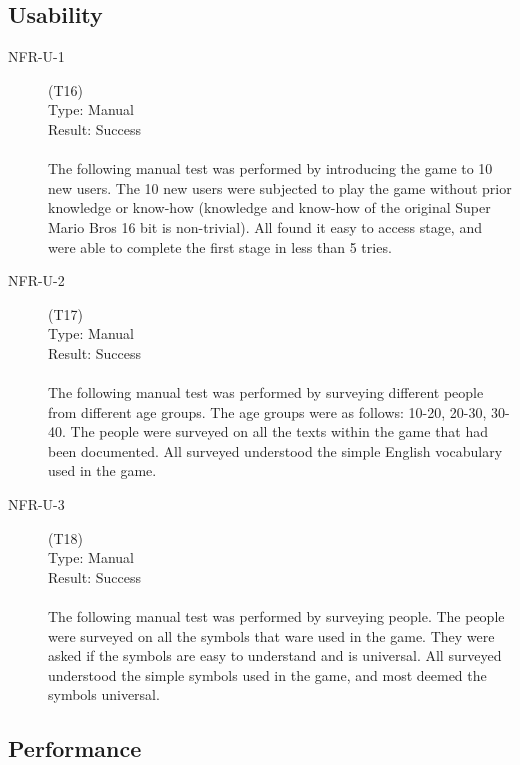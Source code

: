 \documentclass[12pt, titlepage]{article}
\begin{document}
\subsection{Usability}

\begin{description}
    \item[NFR-U-1] (T16)\\
    Type: Manual\\
    Result: Success\\
    \\
    The following manual test was performed by introducing the game to 10 new users. The 10 new users were subjected to play the game without prior knowledge or know-how (knowledge and know-how of the original Super Mario Bros 16 bit is non-trivial). All found it easy to access stage, and were able to complete the first stage in less than 5 tries.

    \item[NFR-U-2] (T17)\\
    Type: Manual\\
    Result: Success\\
    \\
    The following manual test was performed by surveying different people from different age groups. The age groups were as follows: 10-20, 20-30, 30-40. The people were surveyed on all the texts within the game that had been documented. All surveyed understood the simple English vocabulary used in the game.

    \item[NFR-U-3] (T18)\\
    Type: Manual\\
    Result: Success\\
    \\
    The following manual test was performed by surveying people. The people were surveyed on all the symbols that ware used in the game. They were asked if the symbols are easy to understand and is universal. All surveyed understood the simple symbols used in the game, and most deemed the symbols universal.

\end{description}

\subsection{Performance}
\end{document}
